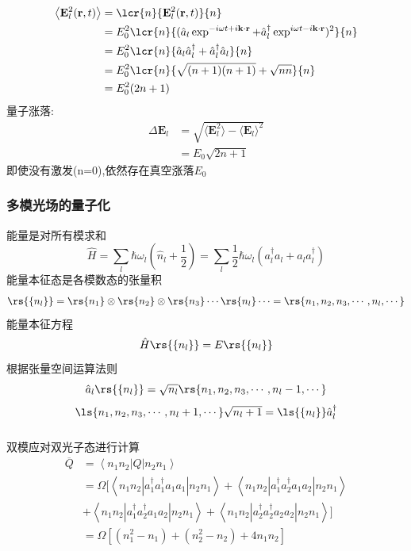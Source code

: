 \begin{frame}
  \frametitle{}
  \[ \begin{aligned}
    \left\langle \mathbf{E}^2_l(\mathbf{r},t) \right\rangle &=\lcr{n}{\mathbf{E}^2_l(\mathbf{r},t)}{n} \\  
    &= E^2_{0} \lcr{n}{(\hat{a}_l \exp^{-i \omega t + i \mathbf{k}\cdot \mathbf{r}} +\hat{a}_l ^\dagger \exp^{i \omega t - i \mathbf{k}\cdot \mathbf{r}})^2}{n}\\ 
    &= E^2_{0} \lcr{n}{\hat{a}_l\hat{a}_l ^\dagger + \hat{a}_l ^\dagger \hat{a}_l}{n}\\ 
    &= E^2_{0} \lcr{n}{\sqrt{(n+1)(n+1)} + \sqrt{nn}}{n}\\ 
    &= E^2_{0} (2n+1)
\end{aligned}\]
量子涨落: 
\[
\begin{aligned}
    \Delta \mathbf{E}_l &= \sqrt{\langle \mathbf{E}^2 _l \rangle - \langle \mathbf{E}_l \rangle ^2} \\
    &= E_0 \sqrt{2n+1}
\end{aligned} \]
即使没有激发(n=0),依然存在真空涨落$ E_0 $  
\end{frame}

\begin{frame} 
\frametitle{多模光场的量子化}
  能量是对所有模求和
   \[ \hat{H} = \sum_l \hbar \omega_l (\hat{n}_l + \frac{1}{2}) = \sum_l \frac{1}{2} \hbar \omega_l(a^{\dagger}_l a_l + a_la^{\dagger}_l ) \]
   能量本征态是各模数态的张量积
   \[ \rs{\{n_l\}}=\rs{n_1}\otimes \rs{n_2}\otimes \rs{n_3}\cdots\rs{n_l}\cdots = \rs{n_1, n_2, n_3, \cdots, n_l,\cdots }\]
  能量本征方程
  \[ \hat{H} \rs{\{n_l\}} = E \rs{\{n_l\}}\]
  根据张量空间运算法则
  \[ \hat{a}_l \rs{\{n_l\}} = \sqrt{n_l} \rs{n_1, n_2, n_3, \cdots, n_l-1,\cdots }\]
  \[  \ls{n_1, n_2, n_3, \cdots, n_l+1,\cdots }\sqrt{n_l+1}=  \ls{\{n_l\}}\hat{a}^{\dagger}_l \]
\end{frame}

\begin{frame} 
  \frametitle{}
  \例[9. 计算双模场算符Q的均值]{
    \[  Q= \Omega \sum_{i,j,k,l} a^{\dagger} _i a^{\dagger} _j a_k a_l, \qquad i,j,k,l =1,2 \]}
    \解 双模应对双光子态进行计算
    \[ \begin{aligned}
        \overline{Q}&= \left\langle n_1 n_2|Q|n_2n_1  \right\rangle \\
        &= \Omega[\left\langle n_1 n_2|a^{\dagger} _1 a^{\dagger} _1 a_1 a_1|n_2n_1  \right\rangle + \left\langle n_1 n_2|a^{\dagger} _1 a^{\dagger} _2 a_1 a_2|n_2n_1  \right\rangle \\ 
        & + \left\langle n_1 n_2|a^{\dagger} _1 a^{\dagger} _2 a_1 a_2|n_2n_1  \right\rangle  
        + \left\langle n_1 n_2|a^{\dagger} _2 a^{\dagger} _2 a_2 a_2|n_2n_1  \right\rangle]  \\
        &= \Omega [(n_1 ^2 -n_1) + (n_2 ^2 -n_2) +4n_1 n_2 ]
    \end{aligned}\]    
 \end{frame}


